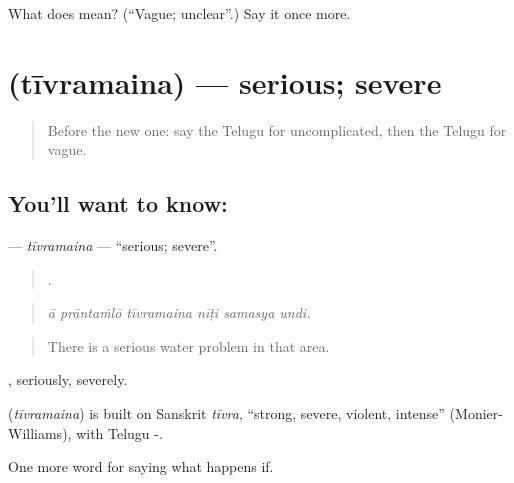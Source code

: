 \begin{tcolorbox}[breakable,colback=teal!4,colframe=teal!35!black,title={Before you move on}]
What does  mean? (\textquotedblleft{}Vague; unclear\textquotedblright{}.) Say it once more.
\end{tcolorbox}
\section[\texorpdfstring{\te{తీవ్రమైన} (tīvramaina)}{తీవ్రమైన (tīvramaina)}]{ (tīvramaina) — serious; severe}

\label{lesson:TE-C437-tivramaina}



\begin{quote}
Before the new one: say the Telugu for uncomplicated, then the Telugu for vague.
\end{quote}

\subsection*{You'll want to know: }
\textbf{} — \emph{tīvramaina} — \textquotedblleft{}serious; severe\textquotedblright{}.

\begin{quote}
     .
\end{quote}

\begin{quote}
\emph{ā prāntaṁlō tīvramaina nīṭi samasya undi.}
\end{quote}

\begin{quote}
There is a serious water problem in that area.
\end{quote}

, seriously, severely.

\begin{cousinweb}
\textbf{} (\emph{tīvramaina}) is built on Sanskrit \emph{tīvra}, \textquotedblleft{}strong, severe, violent, intense\textquotedblright{} (Monier-Williams), with Telugu -.
\end{cousinweb}

\begin{grammarlens}[title={What you've built}]
One more word for saying what happens if.
\end{grammarlens}

